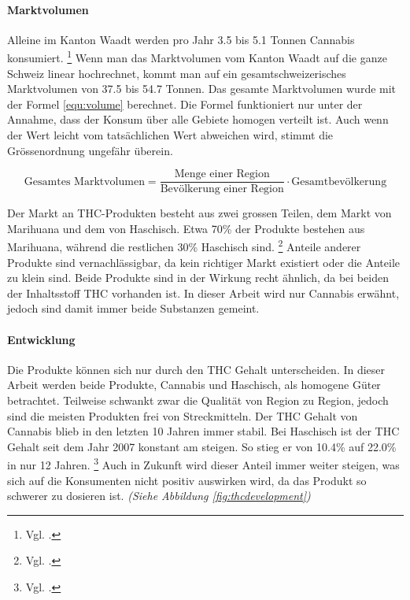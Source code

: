 \documentclass[../main.tex]{subfiles}
\begin{document}
	\paragraph{Marktvolumen}
	Alleine im Kanton Waadt werden pro Jahr 3.5 bis 5.1 Tonnen Cannabis konsumiert.%
	\footnote{Vgl. \cite[12]{zobel}.} 	
	Wenn man das Marktvolumen vom Kanton Waadt auf die ganze Schweiz linear hochrechnet, kommt man auf ein gesamtschweizerisches Marktvolumen von 37.5 bis 54.7 Tonnen.
	Das gesamte Marktvolumen wurde mit der Formel \ref{equ:volume} berechnet.
	Die Formel funktioniert nur unter der Annahme, dass der Konsum über alle Gebiete homogen verteilt ist.
	Auch wenn der Wert leicht vom tatsächlichen Wert abweichen wird, stimmt die Grössenordnung ungefähr überein.
	
	\vspace{7pt}
	\begin{equation}
		\text{Gesamtes Marktvolumen} = \frac{\text{Menge einer Region}}{\text{Bevölkerung einer Region}} \cdot \text{Gesamtbevölkerung}\label{equ:volume}
	\end{equation}
	\vspace{7pt}
	
	\noindent
	Der Markt an THC-Produkten besteht aus zwei grossen Teilen, dem Markt von Marihuana und dem von Haschisch.
	Etwa 70\% der Produkte bestehen aus Marihuana, während die restlichen 30\% Haschisch sind.%
	\footnote{Vgl. \cite[12]{zobel}.}
	Anteile anderer Produkte sind vernachlässigbar, da kein richtiger Markt existiert oder die Anteile zu klein sind.
	Beide Produkte sind in der Wirkung recht ähnlich, da bei beiden der Inhaltsstoff THC vorhanden ist.
	In dieser Arbeit wird nur Cannabis erwähnt, jedoch sind damit immer beide Substanzen gemeint.
	
	\paragraph{Entwicklung}
	Die Produkte können sich nur durch den THC Gehalt unterscheiden.
	In dieser Arbeit werden beide Produkte, Cannabis und Haschisch, als homogene Güter betrachtet.
	Teilweise schwankt zwar die Qualität von Region zu Region, jedoch sind die meisten Produkten frei von Streckmitteln.
	Der THC Gehalt von Cannabis blieb in den letzten 10 Jahren immer stabil.
	Bei Haschisch ist der THC Gehalt seit dem Jahr 2007 konstant am steigen.
	So stieg er von 10.4\% auf 22.0\% in nur 12 Jahren.%
	\footnote{Vgl. \cite[15]{sgrm}.}
	Auch in Zukunft wird dieser Anteil immer weiter steigen, was sich auf die Konsumenten nicht positiv auswirken wird, da das Produkt so schwerer zu dosieren ist.
	\textit{(Siehe Abbildung \ref{fig:thcdevelopment})}
	
\end{document}
